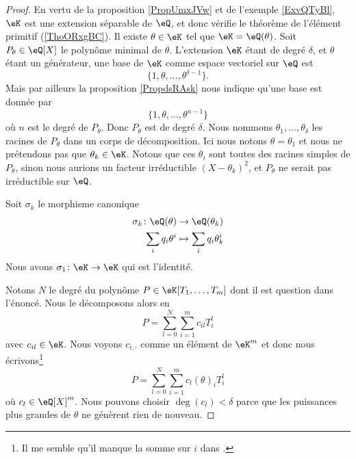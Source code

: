 \begin{proof}
    En vertu de la proposition \ref{PropUmxJVw} et de l'exemple \ref{ExvQTyBl}, \( \eK\) est une extension séparable de \( \eQ\), et donc vérifie le théorème de l'élément primitif (\ref{ThoORxgBC}). Il existe \( \theta\in \eK\) tel que \( \eK=\eQ(\theta)\). Soit \( P_{\theta}\in\eQ[X]\) le polynôme minimal de \( \theta\). L'extension \( \eK\) étant de degré \( \delta\), et \( \theta\) étant un générateur, une base de \( \eK\) comme espace vectoriel sur \( \eQ\) est 
    \begin{equation}
        \{ 1,\theta,\ldots, \theta^{\delta-1} \}.
    \end{equation}
    Mais par ailleurs la proposition \ref{PropdsRAsk} nous indique qu'une base est donnée par
    \begin{equation}
        \{ 1,\theta,\ldots, \theta^{n-1} \}
    \end{equation}
    où \( n\) est le degré de \( P_{\theta}\). Donc \( P_{\theta}\) est de degré \( \delta\). Nous nommons \( \theta_1,\ldots, \theta_{\delta}\) les racines de \( P_{\theta}\) dans un corps de décomposition. Ici nous notons \( \theta=\theta_1\) et nous ne prétendons pas que \( \theta_k\in \eK\). Notons que ces \( \theta_i\) sont toutes des racines simples de \( P_{\theta}\), sinon nous aurions un facteur irréductible \( (X-\theta_k)^2\), et \( P_{\theta}\) ne serait pas irréductible sur \( \eQ\).

    Soit \( \sigma_k\) le morphisme canonique
    \begin{equation}
        \begin{aligned}
            \sigma_k\colon \eQ(\theta)&\to \eQ(\theta_k) \\
            \sum_i q_i\theta^i&\mapsto \sum_iq_i\theta_k^i 
        \end{aligned}
    \end{equation}
    Nous avons \( \sigma_1\colon \eK\to \eK\) qui est l'identité.

    Notons \( N\) le degré du polynôme \( P\in \eK[T_1,\ldots, T_m]\) dont il est question dans l'énoncé. Nous le décomposons alors en
    \begin{equation}
        P=\sum_{l=0}^N\sum_{i=1}^mc_{il}T_i^l
    \end{equation}
    avec \( c_{il}\in \eK\). Nous voyons \( c_{i,\cdot}\) comme un élément de \( \eK^m\) et donc nous écrivons\footnote{Il me semble qu'il manque la somme sur \( i\) dans \cite{fJhCTE}.}
    \begin{equation}
        P=\sum_{l=0}^N\sum_{i=1}^m c_l(\theta)_iT_i^l
    \end{equation}
    où \( c_l\in \eQ[X]^m\). Nous pouvons choisir \( \deg(c_l)<\delta\) parce que les puissances plus grandes de \( \theta\) ne génèrent rien de nouveau.


\end{proof}
